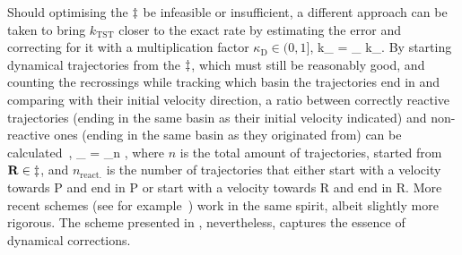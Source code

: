
Should optimising the $\ddagger$ be infeasible or insufficient, a different approach can be taken to bring $k_\text{TST}$ closer to the exact rate by estimating the error and correcting for it with a multiplication factor $\kappa_\text{D} \in (0, 1]$,
k_ = \kappa_ \text{ } k_.
\eeq
By starting dynamical trajectories from the $\ddagger$, which must still be reasonably good, and counting the recrossings while tracking which basin the trajectories end in and comparing with their initial velocity direction, a ratio between correctly reactive trajectories (ending in the same basin as their initial velocity indicated) and non-reactive ones (ending in the same basin as they originated from) can be calculated~\cite{dynamical-corrections-keck-1962},
\kappa_ = \lim_{n \rightarrow \infty} ,
\eeq
where $n$ is the total amount of trajectories, started from ${\mathrm{\mathbf{\bm{R}}}} \in \ddagger$, and $n_\text{react.}$ is the number of trajectories that either start with a velocity towards P and end in P or start with a velocity towards R and end in R.
More recent schemes (see for example~\cite{vtst-2005, dynamical-corrections-chandler-1977, dynamical-corrections-bennett-1977}) work in the same spirit, albeit slightly more rigorous.
The scheme presented in , nevertheless, captures the essence of dynamical corrections.
